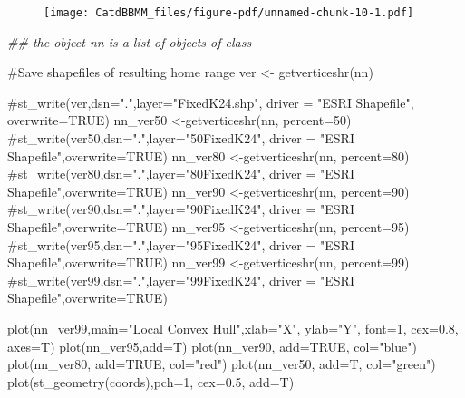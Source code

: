 \documentclass[
  letterpaper,
]{book}
\newenvironment{Shaded}{\begin{snugshade}}{\end{snugshade}}
\newcommand{\AttributeTok}[1]{\textcolor[rgb]{0.40,0.45,0.13}{#1}}
\newcommand{\CommentTok}[1]{\textcolor[rgb]{0.37,0.37,0.37}{#1}}
\newcommand{\ConstantTok}[1]{\textcolor[rgb]{0.56,0.35,0.01}{#1}}
\newcommand{\DecValTok}[1]{\textcolor[rgb]{0.68,0.00,0.00}{#1}}
\newcommand{\DocumentationTok}[1]{\textcolor[rgb]{0.37,0.37,0.37}{\textit{#1}}}
\newcommand{\FloatTok}[1]{\textcolor[rgb]{0.68,0.00,0.00}{#1}}
\newcommand{\FunctionTok}[1]{\textcolor[rgb]{0.28,0.35,0.67}{#1}}
\newcommand{\NormalTok}[1]{\textcolor[rgb]{0.00,0.23,0.31}{#1}}
\newcommand{\OtherTok}[1]{\textcolor[rgb]{0.00,0.23,0.31}{#1}}
\newcommand{\StringTok}[1]{\textcolor[rgb]{0.13,0.47,0.30}{#1}}
\begin{document}
\begin{figure}[H]

{\centering \texttt{[image: CatdBBMM\_files/figure-pdf/unnamed-chunk-10-1.pdf]}

}

\end{figure}

\begin{Shaded}
\begin{Highlighting}[]
\DocumentationTok{\#\# the object nn is a list of objects of class}

\CommentTok{\#Save shapefiles of resulting home range}
\NormalTok{ver }\OtherTok{\textless{}{-}} \FunctionTok{getverticeshr}\NormalTok{(nn)}

\CommentTok{\#st\_write(ver,dsn=".",layer="FixedK24.shp", driver = "ESRI Shapefile", overwrite=TRUE)}
\NormalTok{nn\_ver50 }\OtherTok{\textless{}{-}}\FunctionTok{getverticeshr}\NormalTok{(nn, }\AttributeTok{percent=}\DecValTok{50}\NormalTok{)}
\CommentTok{\#st\_write(ver50,dsn=".",layer="50FixedK24", driver = "ESRI Shapefile",overwrite=TRUE)}
\NormalTok{nn\_ver80 }\OtherTok{\textless{}{-}}\FunctionTok{getverticeshr}\NormalTok{(nn, }\AttributeTok{percent=}\DecValTok{80}\NormalTok{)}
\CommentTok{\#st\_write(ver80,dsn=".",layer="80FixedK24", driver = "ESRI Shapefile",overwrite=TRUE)}
\NormalTok{nn\_ver90 }\OtherTok{\textless{}{-}}\FunctionTok{getverticeshr}\NormalTok{(nn, }\AttributeTok{percent=}\DecValTok{90}\NormalTok{)}
\CommentTok{\#st\_write(ver90,dsn=".",layer="90FixedK24", driver = "ESRI Shapefile",overwrite=TRUE)}
\NormalTok{nn\_ver95 }\OtherTok{\textless{}{-}}\FunctionTok{getverticeshr}\NormalTok{(nn, }\AttributeTok{percent=}\DecValTok{95}\NormalTok{)}
\CommentTok{\#st\_write(ver95,dsn=".",layer="95FixedK24", driver = "ESRI Shapefile",overwrite=TRUE)}
\NormalTok{nn\_ver99 }\OtherTok{\textless{}{-}}\FunctionTok{getverticeshr}\NormalTok{(nn, }\AttributeTok{percent=}\DecValTok{99}\NormalTok{)}
\CommentTok{\#st\_write(ver99,dsn=".",layer="99FixedK24", driver = "ESRI Shapefile",overwrite=TRUE)}

\FunctionTok{plot}\NormalTok{(nn\_ver99,}\AttributeTok{main=}\StringTok{"Local Convex Hull"}\NormalTok{,}\AttributeTok{xlab=}\StringTok{"X"}\NormalTok{, }\AttributeTok{ylab=}\StringTok{"Y"}\NormalTok{, }\AttributeTok{font=}\DecValTok{1}\NormalTok{, }\AttributeTok{cex=}\FloatTok{0.8}\NormalTok{, }\AttributeTok{axes=}\NormalTok{T)}
\FunctionTok{plot}\NormalTok{(nn\_ver95,}\AttributeTok{add=}\NormalTok{T)}
\FunctionTok{plot}\NormalTok{(nn\_ver90, }\AttributeTok{add=}\ConstantTok{TRUE}\NormalTok{, }\AttributeTok{col=}\StringTok{"blue"}\NormalTok{)}
\FunctionTok{plot}\NormalTok{(nn\_ver80, }\AttributeTok{add=}\ConstantTok{TRUE}\NormalTok{, }\AttributeTok{col=}\StringTok{"red"}\NormalTok{)}
\FunctionTok{plot}\NormalTok{(nn\_ver50, }\AttributeTok{add=}\NormalTok{T, }\AttributeTok{col=}\StringTok{"green"}\NormalTok{)}
\FunctionTok{plot}\NormalTok{(}\FunctionTok{st\_geometry}\NormalTok{(coords),}\AttributeTok{pch=}\DecValTok{1}\NormalTok{, }\AttributeTok{cex=}\FloatTok{0.5}\NormalTok{, }\AttributeTok{add=}\NormalTok{T)}
\end{Highlighting}
\end{Shaded}
\end{document}
